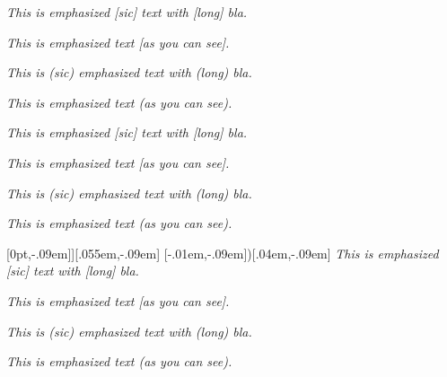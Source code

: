 \documentclass{scrartcl}
\begin{document}
\emph{This is emphasized [sic] text with [long] bla.}

\emph{This is emphasized text [as you can see].}

\emph{This is (sic) emphasized text with (long) bla.}

\emph{This is emphasized text (as you can see).}

\hrulefill

\RenewEmph{[}{]}
\RenewEmph{(}{)}
\emph{This is emphasized [sic] text with [long] bla.}

\emph{This is emphasized text [as you can see].}

\emph{This is (sic) emphasized text with (long) bla.}

\emph{This is emphasized text (as you can see).}

\hrulefill

\RenewEmph{[}[0pt,-.09em]{]}[.055em,-.09em]
\ChangeEmph{(}[-.01em,-.09em]{)}[.04em,-.09em]
\emph{This is emphasized [sic] text with [long] bla.}

\emph{This is emphasized text [as you can see].}

\emph{This is (sic) emphasized text with (long) bla.}

\emph{This is emphasized text (as you can see).}
\end{document}

